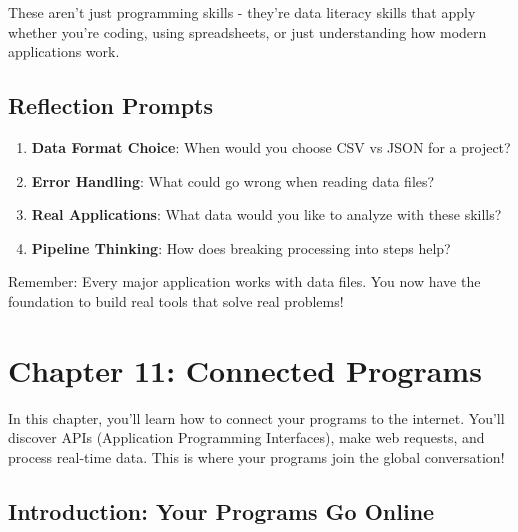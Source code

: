 \documentclass[
  letterpaper,
  DIV=11,
  numbers=noendperiod,
  oneside]{scrreprt}
\providecommand{\tightlist}{%
  \setlength{\itemsep}{0pt}\setlength{\parskip}{0pt}}\usepackage{longtable,booktabs,array}
\begin{document}
These aren't just programming skills - they're data literacy skills that
apply whether you're coding, using spreadsheets, or just understanding
how modern applications work.

\section{Reflection Prompts}\label{reflection-prompts}

\begin{enumerate}
\def\labelenumi{\arabic{enumi}.}
\tightlist
\item
  \textbf{Data Format Choice}: When would you choose CSV vs JSON for a
  project?
\item
  \textbf{Error Handling}: What could go wrong when reading data files?
\item
  \textbf{Real Applications}: What data would you like to analyze with
  these skills?
\item
  \textbf{Pipeline Thinking}: How does breaking processing into steps
  help?
\end{enumerate}

Remember: Every major application works with data files. You now have
the foundation to build real tools that solve real problems!

\chapter{Chapter 11: Connected Programs}\label{sec-connected-programs}

\begin{tcolorbox}[enhanced jigsaw, opacityback=0, colback=white, colframe=quarto-callout-note-color-frame, breakable, titlerule=0mm, coltitle=black, rightrule=.15mm, colbacktitle=quarto-callout-note-color!10!white, left=2mm, bottomtitle=1mm, bottomrule=.15mm, title=\textcolor{quarto-callout-note-color}{\faInfo}\hspace{0.5em}{Chapter Summary}, opacitybacktitle=0.6, toptitle=1mm, leftrule=.75mm, arc=.35mm, toprule=.15mm]

In this chapter, you'll learn how to connect your programs to the
internet. You'll discover APIs (Application Programming Interfaces),
make web requests, and process real-time data. This is where your
programs join the global conversation!

\end{tcolorbox}

\section{Introduction: Your Programs Go
Online}\label{introduction-your-programs-go-online}
\end{document}
